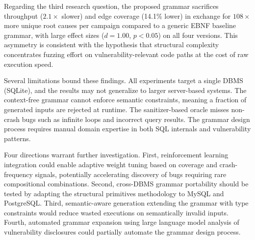 Regarding the third research question, the proposed grammar sacrifices throughput ($2.1\times$ slower) and edge coverage (14.1\% lower) in exchange for $108\times$ more unique root causes per campaign compared to a generic EBNF baseline grammar, with large effect sizes ($d = 1.00$, $p < 0.05$) on all four versions. This asymmetry is consistent with the hypothesis that structural complexity concentrates fuzzing effort on vulnerability-relevant code paths at the cost of raw execution speed.

Several limitations bound these findings. All experiments target a single DBMS (SQLite), and the results may not generalize to larger server-based systems. The context-free grammar cannot enforce semantic constraints, meaning a fraction of generated inputs are rejected at runtime. The sanitizer-based oracle misses non-crash bugs such as infinite loops and incorrect query results. The grammar design process requires manual domain expertise in both SQL internals and vulnerability patterns.

Four directions warrant further investigation. First, reinforcement learning integration could enable adaptive weight tuning based on coverage and crash-frequency signals, potentially accelerating discovery of bugs requiring rare compositional combinations. Second, cross-DBMS grammar portability should be tested by adapting the structural primitives methodology to MySQL and PostgreSQL. Third, semantic-aware generation extending the grammar with type constraints would reduce wasted executions on semantically invalid inputs. Fourth, automated grammar expansion using large language model analysis of vulnerability disclosures could partially automate the grammar design process.
